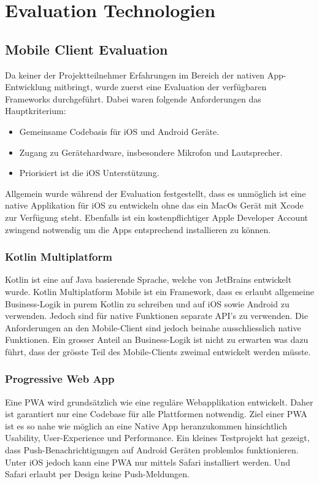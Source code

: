 \section{Evaluation Technologien}\label{sec:evaluation-technologien}

\subsection{Mobile Client Evaluation}\label{subsec:mobile-client-eval}

Da keiner der Projektteilnehmer Erfahrungen im Bereich der nativen App-Entwicklung mitbringt, wurde zuerst eine Evaluation der verfügbaren Frameworks durchgeführt.
Dabei waren folgende Anforderungen das Hauptkriterium:
\begin{itemize}
    \item Gemeinsame Codebasis für iOS und Android Geräte.
    \item Zugang zu Gerätehardware, insbesondere Mikrofon und Lautsprecher.
    \item Priorisiert ist die iOS Unterstützung.
\end{itemize}

Allgemein wurde während der Evaluation festgestellt, dass es unmöglich ist eine native Applikation für iOS zu entwickeln ohne das ein MacOs Gerät mit Xcode zur Verfügung steht.
Ebenfalls ist ein kostenpflichtiger Apple Developer Account zwingend notwendig um die Apps entsprechend installieren zu können.

\subsubsection{Kotlin Multiplatform}
Kotlin ist eine auf Java basierende Sprache, welche von JetBrains entwickelt wurde.
Kotlin Multiplatform Mobile ist ein Framework, dass es erlaubt allgemeine Business-Logik in purem Kotlin zu schreiben und auf iOS sowie Android zu verwenden.
Jedoch sind für native Funktionen separate API's zu verwenden. Die Anforderungen an den Mobile-Client sind jedoch beinahe ausschliesslich native Funktionen.
Ein grosser Anteil an Business-Logik ist nicht zu erwarten was dazu führt, dass der grösste Teil des Mobile-Clients zweimal entwickelt werden müsste.\cite{kotlin-platform-specific-APIs}
\subsubsection{Progressive Web App}
Eine PWA wird grundsätzlich wie eine reguläre Webapplikation entwickelt.
Daher ist garantiert nur eine Codebase für alle Plattformen notwendig.
Ziel einer PWA ist es so nahe wie möglich an eine Native App heranzukommen hinsichtlich Usability, User-Experience und Performance.\cite{what-are-PWAS}
Ein kleines Testprojekt hat gezeigt, dass Push-Benachrichtigungen auf Android Geräten problemlos funktionieren.
Unter iOS jedoch kann eine PWA nur mittels Safari installiert werden. Und Safari erlaubt per Design keine Push-Meldungen.\cite{canIUsePush,iOSSupportPush}

